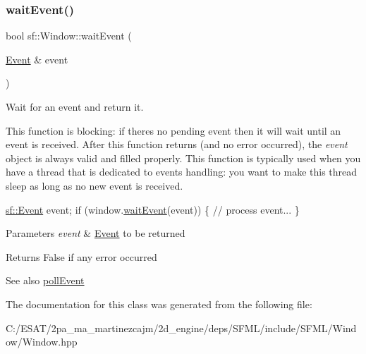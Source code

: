 \subsubsection{\texorpdfstring{wait\+Event()}{waitEvent()}}
{\footnotesize\ttfamily bool sf\+::\+Window\+::wait\+Event (\begin{DoxyParamCaption}\item[{\hyperlink{classsf_1_1_event}{Event} \&}]{event }\end{DoxyParamCaption})}



Wait for an event and return it. 

This function is blocking\+: if there\textquotesingle{}s no pending event then it will wait until an event is received. After this function returns (and no error occurred), the {\itshape event} object is always valid and filled properly. This function is typically used when you have a thread that is dedicated to events handling\+: you want to make this thread sleep as long as no new event is received. 
\begin{DoxyCode}
\hyperlink{classsf_1_1_event}{sf::Event} event;
\textcolor{keywordflow}{if} (window.\hyperlink{classsf_1_1_window_aaf02ab64fbc1d374eef3696df54137bc}{waitEvent}(event))
\{
   \textcolor{comment}{// process event...}
\}
\end{DoxyCode}



\begin{DoxyParams}{Parameters}
{\em event} & \hyperlink{classsf_1_1_event}{Event} to be returned\\
\hline
\end{DoxyParams}
\begin{DoxyReturn}{Returns}
False if any error occurred
\end{DoxyReturn}
\begin{DoxySeeAlso}{See also}
\hyperlink{classsf_1_1_window_a338e996585faf82e93069858e3b531b7}{poll\+Event} 
\end{DoxySeeAlso}


The documentation for this class was generated from the following file\+:\begin{DoxyCompactItemize}
\item 
C\+:/\+E\+S\+A\+T/2pa\+\_\+ma\+\_\+martinezcajm/2d\+\_\+engine/deps/\+S\+F\+M\+L/include/\+S\+F\+M\+L/\+Window/Window.\+hpp\end{DoxyCompactItemize}
